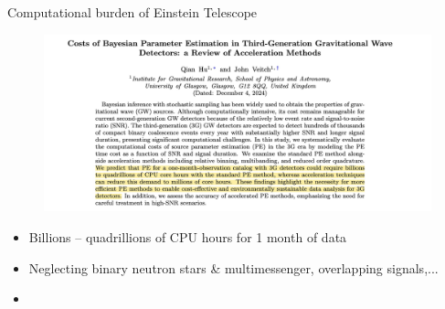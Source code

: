 \documentclass[usenames,dvipsnames,t]{beamer}
\begin{document}
\begin{frame}{Computational burden of Einstein Telescope}

  \vspace{-5mm}

  \begin{figure}
    \centering
    \includegraphics[width=0.95\linewidth]{Figures/Hu_Veitch.jpg}
  \end{figure}

  \vspace{2mm}

  \begin{itemize}
    \item Billions -- quadrillions of CPU hours for 1 month of data~\cite{Hu:2024mvn}

    \item Neglecting binary neutron stars \& multimessenger, overlapping signals,...

    \item {}
  \end{itemize}
\end{frame}
\end{document}
